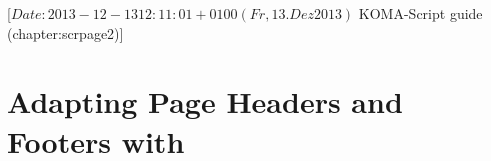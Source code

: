%
%
%
%
%
%
%
%
% 
%
%
%
%

                 [$Date: 2013-12-13 12:11:01 +0100 (Fr, 13. Dez 2013) $
                  KOMA-Script guide (chapter:scrpage2)]



\chapter{Adapting Page Headers and Footers with }

